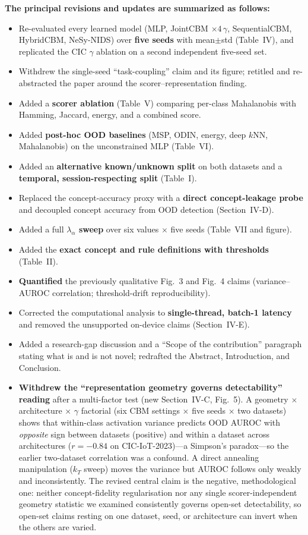 \documentclass[11pt]{article}
\begin{document}
\smallskip
\noindent\textbf{The principal revisions and updates are summarized as follows:}
\begin{itemize}
  \item Re-evaluated every learned model (MLP, JointCBM $\times4\,\gamma$,
  SequentialCBM, HybridCBM, NeSy-NIDS) over \textbf{five seeds} with mean$\pm$std
  (Table~IV), and replicated the CIC $\gamma$ ablation on a second independent
  five-seed set.
  \item Withdrew the single-seed ``task-coupling'' claim and its figure; retitled
  and re-abstracted the paper around the scorer--representation finding.
  \item Added a \textbf{scorer ablation} (Table~V) comparing per-class
  Mahalanobis with Hamming, Jaccard, energy, and a combined score.
  \item Added \textbf{post-hoc OOD baselines} (MSP, ODIN, energy, deep $k$NN,
  Mahalanobis) on the unconstrained MLP (Table~VI).
  \item Added an \textbf{alternative known/unknown split} on both datasets and a
  \textbf{temporal, session-respecting split} (Table~I).
  \item Replaced the concept-accuracy proxy with a \textbf{direct concept-leakage
  probe} and decoupled concept accuracy from OOD detection (Section~IV-D).
  \item Added a full \textbf{$\lambda_\alpha$ sweep} over six values $\times$ five
  seeds (Table~VII and figure).
  \item Added the \textbf{exact concept and rule definitions with thresholds}
  (Table~II).
  \item \textbf{Quantified} the previously qualitative Fig.~3 and Fig.~4 claims
  (variance--AUROC correlation; threshold-drift reproducibility).
  \item Corrected the computational analysis to \textbf{single-thread, batch-1
  latency} and removed the unsupported on-device claims (Section~IV-E).
  \item Added a research-gap discussion and a ``Scope of the contribution''
  paragraph stating what is and is not novel; redrafted the Abstract,
  Introduction, and Conclusion.
  \item \textbf{Withdrew the ``representation geometry governs detectability''
  reading} after a multi-factor test (new Section~IV-C, Fig.~5). A geometry
  $\times$ architecture $\times$ $\gamma$ factorial (six CBM settings $\times$ five
  seeds $\times$ two datasets) shows that within-class activation variance predicts
  OOD AUROC with \emph{opposite} sign between datasets (positive) and within a
  dataset across architectures ($r{=}-0.84$ on CIC-IoT-2023)---a Simpson's
  paradox---so the earlier two-dataset correlation was a confound. A direct
  annealing manipulation ($k_T$ sweep) moves the variance but AUROC follows only
  weakly and inconsistently. The revised central claim is the negative,
  methodological one: neither concept-fidelity regularisation nor any single
  scorer-independent geometry statistic we examined consistently governs open-set
  detectability, so open-set claims resting on one dataset, seed, or architecture
  can invert when the others are varied.
\end{itemize}
\end{document}

